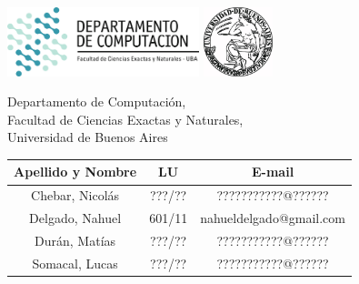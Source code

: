 \thispagestyle{caratula}

\begin{center}

\includegraphics[height=2cm]{DC.png} 
\hfill
\includegraphics[height=2cm]{UBA.jpg} 

\vspace{2cm}

Departamento de Computación,\\
Facultad de Ciencias Exactas y Naturales,\\
Universidad de Buenos Aires

\vspace{4cm}

\begin{Huge}
\titulo{}
\end{Huge}

\vspace{0.5cm}

\begin{Large}
\materia{}
\end{Large}

\vspace{1cm}

\cuatrimestre{}

\vspace{4cm}

\begin{tabular}{c c c}
Apellido y Nombre & LU & E-mail\\
\hline
Chebar, Nicolás  & ???/?? & ???????????@??????\\
Delgado, Nahuel  & 601/11 & nahueldelgado@gmail.com\\
Durán, Matías  & ???/?? & ???????????@??????\\
Somacal, Lucas  & ???/?? & ???????????@??????\\
\end{tabular}

\end{center}
